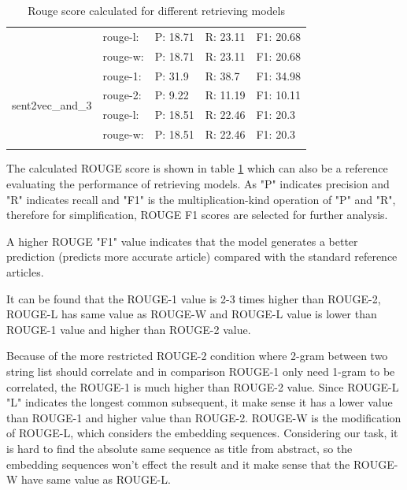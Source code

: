 \documentclass[10pt,a4paper,fleqn]{report}
\begin{document}
\begin{table}[htbp]
\begin{tabular}{crrrr}
							& \multicolumn{1}{l}{rouge-l:} & \multicolumn{1}{l}{P: 18.71} & \multicolumn{1}{l}{R: 23.11} & \multicolumn{1}{l}{F1: 20.68} \\
							& \multicolumn{1}{l}{rouge-w:} & \multicolumn{1}{l}{P: 18.71} & \multicolumn{1}{l}{R: 23.11} & \multicolumn{1}{l}{F1: 20.68} \\
							\midrule
							\multirow{4}[2]{*}{sent2vec\_and\_3} & \multicolumn{1}{l}{rouge-1:} & \multicolumn{1}{l}{P: 31.9} & \multicolumn{1}{l}{R: 38.7} & \multicolumn{1}{l}{F1: 34.98} \\
							& \multicolumn{1}{l}{rouge-2:} & \multicolumn{1}{l}{P: 9.22} & \multicolumn{1}{l}{R: 11.19} & \multicolumn{1}{l}{F1: 10.11} \\
							& \multicolumn{1}{l}{rouge-l:} & \multicolumn{1}{l}{P: 18.51} & \multicolumn{1}{l}{R: 22.46} & \multicolumn{1}{l}{F1: 20.3} \\
							& \multicolumn{1}{l}{rouge-w:} & \multicolumn{1}{l}{P: 18.51} & \multicolumn{1}{l}{R: 22.46} & \multicolumn{1}{l}{F1: 20.3} \\
							\midrule
							&       &       &       &  \\
						\end{tabular}%
						\caption{Rouge score calculated for different retrieving models}
						\label{tab: rouge_score}%
					\end{table}%
					
					The calculated ROUGE score is shown in table \ref{tab: rouge_score} which can also be a reference evaluating the performance of retrieving models.	As "P" indicates precision and "R" indicates recall and "F1" is the multiplication-kind operation of "P" and "R", therefore for simplification, ROUGE F1 scores are selected for further analysis.
					
					A higher ROUGE "F1" value indicates that the model generates a better prediction (predicts more accurate article) compared with the standard reference articles.
					
					It can be found that the ROUGE-1 value is 2-3 times higher than ROUGE-2, ROUGE-L has same value as ROUGE-W and ROUGE-L value is lower than ROUGE-1 value and higher than ROUGE-2 value. 
					
					Because of the more restricted ROUGE-2 condition where 2-gram between two string list should correlate and in comparison ROUGE-1 only need 1-gram to be correlated, the ROUGE-1 is much higher than ROUGE-2 value.					
					Since ROUGE-L "L" indicates the longest common subsequent, it make sense it has a lower value than ROUGE-1 and higher value than ROUGE-2.					
					ROUGE-W is the modification of ROUGE-L, which considers the embedding sequences. Considering our task, it is hard to find the absolute same sequence as title from abstract, so the embedding sequences won't effect the result and it make sense that the ROUGE-W have same value as ROUGE-L.
						
\end{document}
